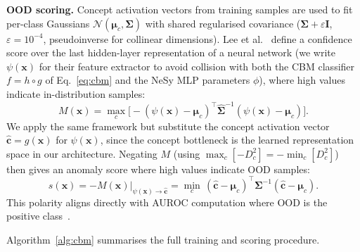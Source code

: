 \documentclass[conference]{IEEEtran}
\begin{document}
\textbf{OOD scoring.}
Concept activation vectors from training samples are used to fit
per-class Gaussians $\mathcal{N}(\boldsymbol{\mu}_c,\boldsymbol{\Sigma})$
with shared regularised covariance ($\boldsymbol{\Sigma}+\varepsilon\mathbf{I}$,
$\varepsilon{=}10^{-4}$, pseudoinverse for collinear dimensions).
Lee et al.~\cite{lee2018simple} define a confidence score over the last
hidden-layer representation of a neural network (we write $\psi(\mathbf{x})$
for their feature extractor to avoid collision with both the CBM classifier
$f{=}h\circ g$ of Eq.~\ref{eq:cbm} and the NeSy MLP parameters $\phi$),
where high values indicate in-distribution samples:
\[
  M(\mathbf{x}) = \max_c\bigl[-(\psi(\mathbf{x})-\boldsymbol{\mu}_c)^\top
  \hat{\boldsymbol{\Sigma}}^{-1}(\psi(\mathbf{x})-\boldsymbol{\mu}_c)\bigr].
\]
We apply the same framework but substitute the concept activation vector
$\hat{\mathbf{c}}=g(\mathbf{x})$ for $\psi(\mathbf{x})$, since the concept
bottleneck is the learned representation space in our architecture.
Negating $M$ (using $\max_c[-D^2_c]=-\min_c[D^2_c]$) then gives an anomaly
score where high values indicate OOD samples:
\begin{equation}
  s(\mathbf{x}) = -M(\mathbf{x})\big|_{\psi(\mathbf{x})\to\hat{\mathbf{c}}}
  = \min_c\,(\hat{\mathbf{c}}-\boldsymbol{\mu}_c)^\top
  \boldsymbol{\Sigma}^{-1}(\hat{\mathbf{c}}-\boldsymbol{\mu}_c).
  \label{eq:mahal}
\end{equation}
This polarity aligns directly with AUROC computation where OOD is the positive
class~\cite{fort2021exploring}.

Algorithm~\ref{alg:cbm} summarises the full training and scoring
procedure.
\end{document}
